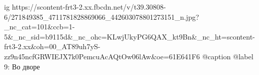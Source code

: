  
 
 
 
 

\ifcmt
  ig https://scontent-frt3-2.xx.fbcdn.net/v/t39.30808-6/271849385_4711781828869066_442603078801273151_n.jpg?_nc_cat=101&ccb=1-5&_nc_sid=b9115d&_nc_ohc=KLwjUkyPG6QAX_kt9Bn&_nc_ht=scontent-frt3-2.xx&oh=00_AT89uh7yS-zz9n45ncfGRWIEJX7k0PemcuAcAQtOw06lAw&oe=61E641F6
  @caption @label 9: Во дворе
\fi
